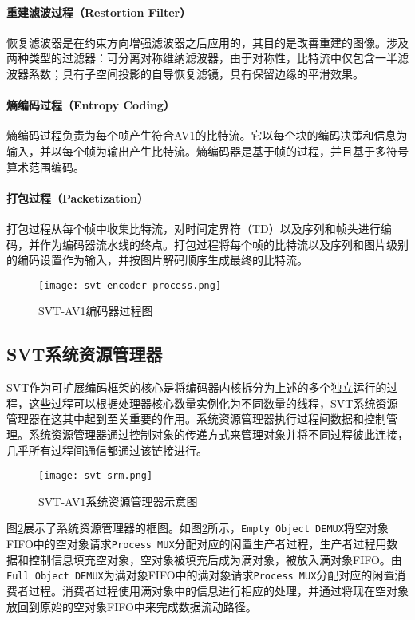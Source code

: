   \paragraph{重建滤波过程（Restortion Filter）} 恢复滤波器是在约束方向增强滤波器之后应用的，其目的是改善重建的图像。涉及两种类型的过滤器：可分离对称维纳滤波器，由于对称性，比特流中仅包含一半滤波器系数；具有子空间投影的自导恢复滤镜，具有保留边缘的平滑效果。

  \paragraph{熵编码过程（Entropy Coding）} 熵编码过程负责为每个帧产生符合AV1的比特流。它以每个块的编码决策和信息为输入，并以每个帧为输出产生比特流。熵编码器是基于帧的过程，并且基于多符号算术范围编码。

  \paragraph{打包过程（Packetization）} 打包过程从每个帧中收集比特流，对时间定界符（TD）以及序列和帧头进行编码，并作为编码器流水线的终点。打包过程将每个帧的比特流以及序列和图片级别的编码设置作为输入，并按图片解码顺序生成最终的比特流。
  \begin{figure}[!htp]
    \centering
    \texttt{[image: svt-encoder-process.png]}
    \caption{SVT-AV1编码器过程图}
  \label{fig:svt-encoder-process}
  \end{figure}

\subsection{SVT系统资源管理器}

  SVT作为可扩展编码框架的核心是将编码器内核拆分为上述的多个独立运行的过程，这些过程可以根据处理器核心数量实例化为不同数量的线程，SVT系统资源管理器在这其中起到至关重要的作用。系统资源管理器执行过程间数据和控制管理。系统资源管理器通过控制对象的传递方式来管理对象并将不同过程彼此连接，几乎所有过程间通信都通过该链接进行。

  \begin{figure}[!htp]
    \centering
    \texttt{[image: svt-srm.png]}
    \caption{SVT-AV1系统资源管理器示意图}
  \label{fig:svt-srm}
  \end{figure}

  图\ref{fig:svt-srm}展示了系统资源管理器的框图。如图\ref{fig:svt-srm}所示，\texttt{Empty Object DEMUX}将空对象FIFO中的空对象请求\texttt{Process MUX}分配对应的闲置生产者过程，生产者过程用数据和控制信息填充空对象，空对象被填充后成为满对象，被放入满对象FIFO。由\texttt{Full Object DEMUX}为满对象FIFO中的满对象请求\texttt{Process MUX}分配对应的闲置消费者过程。消费者过程使用满对象中的信息进行相应的处理，并通过将现在空对象放回到原始的空对象FIFO中来完成数据流动路径。

